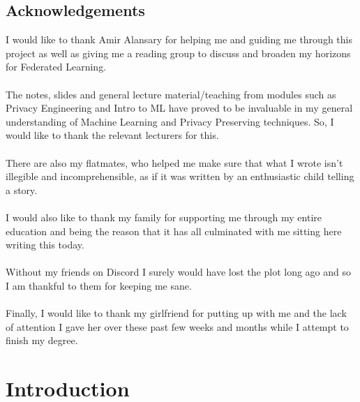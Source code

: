 \documentclass[12pt,twoside]{report}
\begin{document}
\section*{Acknowledgements}
I would like to thank Amir Alansary for helping me and guiding me through this project as well as giving me a reading group to discuss and broaden my horizons for Federated Learning.
\\ \\
The notes, slides and general lecture material/teaching from modules such as Privacy Engineering and Intro to ML have proved to be invaluable in my general understanding of Machine Learning and Privacy Preserving techniques. So, I would like to thank the relevant lecturers for this.
\\ \\
There are also my flatmates, who helped me make sure that what I wrote isn't illegible and incomprehensible, as if it was written by an enthusiastic child telling a story.
\\ \\
I would also like to thank my family for supporting me through my entire education and being the reason that it has all culminated with me sitting here writing this today.
\\ \\
Without my friends on Discord I surely would have lost the plot long ago and so I am thankful to them for keeping me sane.
\\ \\
Finally, I would like to thank my girlfriend for putting up with me and the lack of attention I gave her over these past few weeks and months while I attempt to finish my degree.

\clearpage{\pagestyle{empty}}

\tableofcontents 

\listoffigures

\listoftables


\clearpage{\pagestyle{empty}}
\setcounter{page}{1}
\fancyhead[LE,RO]{\slshape \rightmark}
\fancyhead[LO,RE]{\slshape \leftmark}

\chapter{Introduction}


\end{document}
